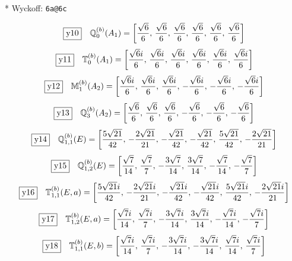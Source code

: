 \documentclass[fleqn,10pt,landscape]{jsarticle}
\begin{document}
\noindent ** Wyckoff: \texttt{6a@6c}

\begin{dmath*}
\fbox{y10}\quad \mathbb{Q}_{0}^{(b)}(A_{1})=\left[ \frac{\sqrt{6}}{6},\, \frac{\sqrt{6}}{6},\, \frac{\sqrt{6}}{6},\, \frac{\sqrt{6}}{6},\, \frac{\sqrt{6}}{6},\, \frac{\sqrt{6}}{6} \right]
\end{dmath*}
\begin{dmath*}
\fbox{y11}\quad \mathbb{T}_{0}^{(b)}(A_{1})=\left[ \frac{\sqrt{6} i}{6},\, \frac{\sqrt{6} i}{6},\, \frac{\sqrt{6} i}{6},\, \frac{\sqrt{6} i}{6},\, \frac{\sqrt{6} i}{6},\, \frac{\sqrt{6} i}{6} \right]
\end{dmath*}
\begin{dmath*}
\fbox{y12}\quad \mathbb{M}_{1}^{(b)}(A_{2})=\left[ \frac{\sqrt{6} i}{6},\, \frac{\sqrt{6} i}{6},\, \frac{\sqrt{6} i}{6},\, - \frac{\sqrt{6} i}{6},\, - \frac{\sqrt{6} i}{6},\, - \frac{\sqrt{6} i}{6} \right]
\end{dmath*}
\begin{dmath*}
\fbox{y13}\quad \mathbb{Q}_{3}^{(b)}(A_{2})=\left[ \frac{\sqrt{6}}{6},\, \frac{\sqrt{6}}{6},\, \frac{\sqrt{6}}{6},\, - \frac{\sqrt{6}}{6},\, - \frac{\sqrt{6}}{6},\, - \frac{\sqrt{6}}{6} \right]
\end{dmath*}
\begin{dmath*}
\fbox{y14}\quad \mathbb{Q}_{1,1}^{(b)}(E)=\left[ \frac{5 \sqrt{21}}{42},\, - \frac{2 \sqrt{21}}{21},\, - \frac{\sqrt{21}}{42},\, - \frac{\sqrt{21}}{42},\, \frac{5 \sqrt{21}}{42},\, - \frac{2 \sqrt{21}}{21} \right]
\end{dmath*}
\begin{dmath*}
\fbox{y15}\quad \mathbb{Q}_{1,2}^{(b)}(E)=\left[ \frac{\sqrt{7}}{14},\, \frac{\sqrt{7}}{7},\, - \frac{3 \sqrt{7}}{14},\, \frac{3 \sqrt{7}}{14},\, - \frac{\sqrt{7}}{14},\, - \frac{\sqrt{7}}{7} \right]
\end{dmath*}
\begin{dmath*}
\fbox{y16}\quad \mathbb{T}_{1,1}^{(b)}(E,a)=\left[ \frac{5 \sqrt{21} i}{42},\, - \frac{2 \sqrt{21} i}{21},\, - \frac{\sqrt{21} i}{42},\, - \frac{\sqrt{21} i}{42},\, \frac{5 \sqrt{21} i}{42},\, - \frac{2 \sqrt{21} i}{21} \right]
\end{dmath*}
\begin{dmath*}
\fbox{y17}\quad \mathbb{T}_{1,2}^{(b)}(E,a)=\left[ \frac{\sqrt{7} i}{14},\, \frac{\sqrt{7} i}{7},\, - \frac{3 \sqrt{7} i}{14},\, \frac{3 \sqrt{7} i}{14},\, - \frac{\sqrt{7} i}{14},\, - \frac{\sqrt{7} i}{7} \right]
\end{dmath*}
\begin{dmath*}
\fbox{y18}\quad \mathbb{T}_{1,1}^{(b)}(E,b)=\left[ \frac{\sqrt{7} i}{14},\, \frac{\sqrt{7} i}{7},\, - \frac{3 \sqrt{7} i}{14},\, - \frac{3 \sqrt{7} i}{14},\, \frac{\sqrt{7} i}{14},\, \frac{\sqrt{7} i}{7} \right]
\end{dmath*}
\end{document}
